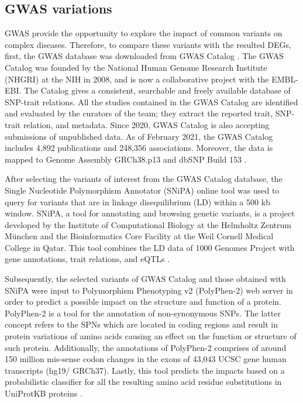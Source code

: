 \subsection{GWAS variations} \label{gwas}

GWAS provide the opportunity to explore the impact of common variants on complex diseases. Therefore, to compare these variants with the resulted DEGs, first, the GWAS database was downloaded from GWAS Catalog \cite{gwascat}. The GWAS Catalog was founded by the National Human Genome Research Institute (NHGRI) at the NIH in 2008, and is now a collaborative project with the EMBL-EBI. The Catalog gives a consistent, searchable and freely available database of SNP-trait relations. All the studies contained in the GWAS Catalog are identified and evaluated by the curators of the team; they extract the reported trait, SNP-trait relation, and metadata. Since 2020, GWAS Catalog is also accepting submissions of unpublished data. As of February 2021, the GWAS Catalog includes 4,892 publications and 248,356 associations. Moreover, the data is mapped to Genome Assembly GRCh38.p13 and dbSNP Build 153 \cite{gwascat}.

After selecting the variants of interest from the GWAS Catalog database, the Single Nucleotide Polymorphism Annotator (SNiPA) \cite{snipa} online tool was used to query for variants that are in linkage disequilibrium (LD) within a 500 kb window. SNiPA, a tool for annotating and browsing genetic variants, is a project developed by the Institute of Computational Biology at the Helmholtz Zentrum München and the Bioinformatics Core Facility at the Weil Cornell Medical College in Qatar. This tool combines the LD data of 1000 Genomes Project with gene annotations, trait relations, and eQTLs \cite{snipa}.

Subsequently, the selected variants of GWAS Catalog and those obtained with SNiPA were input to Polymorphism Phenotyping v2 (PolyPhen-2) \cite{polyphen} web server in order to predict a possible impact on the structure and function of a protein. PolyPhen-2 is a tool for the annotation of non-synonymous SNPs. The latter concept refers to the SPNs which are located in coding regions and result in protein variations of amino acids causing an effect on the function or structure of such protein. Additionally, the annotations of PolyPhen-2 comprises of around 150 million mis-sense codon changes in the exons of 43,043 UCSC gene human transcripts (hg19/ GRCh37). Lastly, this tool predicts the impacts based on a probabilistic classifier for all the resulting amino acid residue substitutions in UniProtKB proteins \cite{polyphen}.

